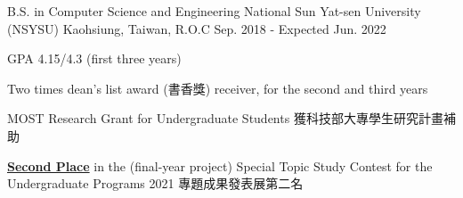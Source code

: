 

\begin{cventries}

  \cventry
    {B.S. in Computer Science and Engineering} %
    {National Sun Yat-sen University (NSYSU)} %
    {Kaohsiung, Taiwan, R.O.C} %
    {Sep. 2018 - Expected Jun. 2022} %
    {
      \begin{cvitems} %
        \item {GPA 4.15/4.3 (first three years)}
        \item {Two times dean's list award (書香獎) receiver, for the second and third years}
        \item {MOST Research Grant for Undergraduate Students 獲科技部大專學生研究計畫補助}
        \item {\textbf{\href{https://project2021.cse.nsysu.edu.tw/Award.html}{Second Place}} in the (final-year project) Special Topic Study Contest for the Undergraduate Programs 2021 專題成果發表展第二名}
      \end{cvitems}
    }

\end{cventries}
